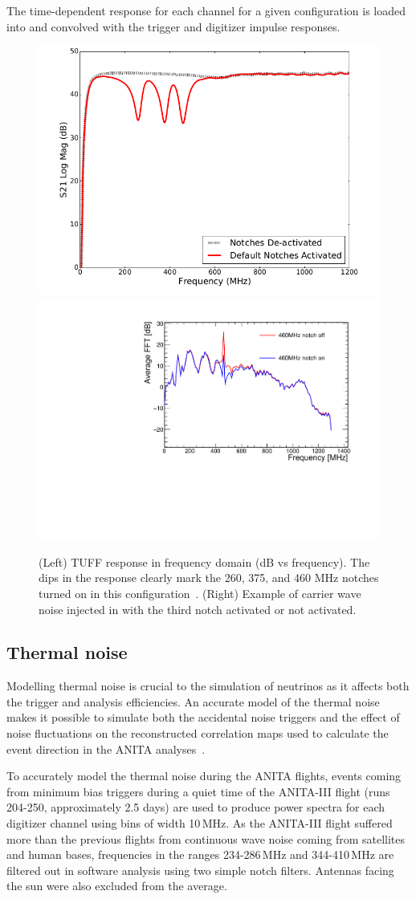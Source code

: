 The time-dependent response for each channel for a given configuration is loaded into \icemc and convolved with the trigger and digitizer impulse responses. 

\begin{figure}
  \centering
 \includegraphics[width=0.45\linewidth] {./Figs/config_P_response_freq.png} 
 \includegraphics[width=0.45\linewidth] {./Figs/Icemc_tuffs.pdf} 
  \caption{(Left) TUFF response in frequency domain (dB vs frequency). The dips in the response clearly mark the 260, 375, and 460 MHz notches turned on in this configuration~\cite{Allison:2017vtk}.
  (Right) Example of carrier wave noise injected in \icemc with the third notch activated or not activated.}
\label{fig:TUFFs}
\end{figure}



\subsection{Thermal noise}
\label{subsec:ANITA_thermalNoise}
Modelling thermal noise is crucial to the simulation of
neutrinos as it affects both the trigger and analysis efficiencies.
An accurate model of the thermal noise makes it possible to simulate both the
accidental noise triggers and the effect of noise fluctuations on the
reconstructed correlation maps used to calculate the event direction in the ANITA analyses~\cite{romero2015interferometric}.

To accurately model the thermal noise during the ANITA flights, events coming from minimum bias triggers during
a quiet time of the ANITA-III flight (runs 204-250, approximately 2.5
days) are used to produce power spectra for each digitizer channel
using bins of width 10\,MHz.
As the ANITA-III flight suffered more than the previous flights 
from continuous wave noise coming
from satellites and human bases, frequencies in the ranges
234-286\,MHz and 344-410\,MHz are filtered out in software analysis
using two simple notch filters. 
Antennas facing the sun were also excluded from the average.

